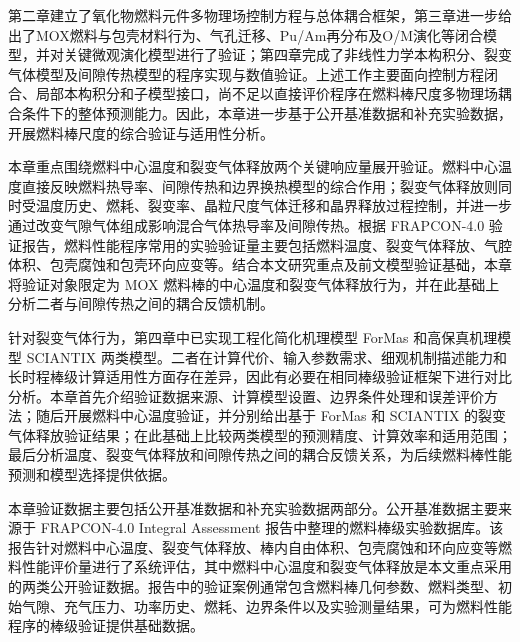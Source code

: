 


第二章建立了氧化物燃料元件多物理场控制方程与总体耦合框架，第三章进一步给出了MOX燃料与包壳材料行为、气孔迁移、Pu/Am再分布及O/M演化等闭合模型，并对关键微观演化模型进行了验证；第四章完成了非线性力学本构积分、裂变气体模型及间隙传热模型的程序实现与数值验证。上述工作主要面向控制方程闭合、局部本构积分和子模型接口，尚不足以直接评价程序在燃料棒尺度多物理场耦合条件下的整体预测能力。因此，本章进一步基于公开基准数据和补充实验数据，开展燃料棒尺度的综合验证与适用性分析。

本章重点围绕燃料中心温度和裂变气体释放两个关键响应量展开验证。燃料中心温度直接反映燃料热导率、间隙传热和边界换热模型的综合作用；裂变气体释放则同时受温度历史、燃耗、裂变率、晶粒尺度气体迁移和晶界释放过程控制，并进一步通过改变气隙气体组成影响混合气体热导率及间隙传热。根据 FRAPCON-4.0 验证报告，燃料性能程序常用的实验验证量主要包括燃料温度、裂变气体释放、气腔体积、包壳腐蚀和包壳环向应变等。结合本文研究重点及前文模型验证基础，本章将验证对象限定为 MOX 燃料棒的中心温度和裂变气体释放行为，并在此基础上分析二者与间隙传热之间的耦合反馈机制。

针对裂变气体行为，第四章中已实现工程化简化机理模型 ForMas 和高保真机理模型 SCIANTIX 两类模型。二者在计算代价、输入参数需求、细观机制描述能力和长时程棒级计算适用性方面存在差异，因此有必要在相同棒级验证框架下进行对比分析。本章首先介绍验证数据来源、计算模型设置、边界条件处理和误差评价方法；随后开展燃料中心温度验证，并分别给出基于 ForMas 和 SCIANTIX 的裂变气体释放验证结果；在此基础上比较两类模型的预测精度、计算效率和适用范围；最后分析温度、裂变气体释放和间隙传热之间的耦合反馈关系，为后续燃料棒性能预测和模型选择提供依据。



本章验证数据主要包括公开基准数据和补充实验数据两部分。公开基准数据主要来源于 FRAPCON-4.0 Integral Assessment 报告中整理的燃料棒级实验数据库。该报告针对燃料中心温度、裂变气体释放、棒内自由体积、包壳腐蚀和环向应变等燃料性能评价量进行了系统评估，其中燃料中心温度和裂变气体释放是本文重点采用的两类公开验证数据。报告中的验证案例通常包含燃料棒几何参数、燃料类型、初始气隙、充气压力、功率历史、燃耗、边界条件以及实验测量结果，可为燃料性能程序的棒级验证提供基础数据。

